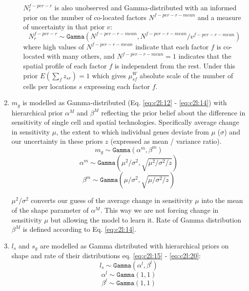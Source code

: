 \documentclass[11pt,a4paper]{article}
\begin{document}
\begin{enumerate}
\begin{itemize}
        $N_r^{f-per-r}$ is also unobserved and Gamma-distributed with an informed prior on the number of co-located factors $N^{f-per-r-mean}$ and a measure of uncertainty in that prior $v$:
        \begin{equation} \label{eq:c2l:11}
        N_r^{f-per-r} \sim \mathtt{Gamma}(N^{f-per-r-mean}, N^{f-per-r-mean} / v^{f-per-r-mean})
        \end{equation}
        where high values of $N^{f-per-r-mean}$ indicate that each factor $f$ is co-located with many others, and $N^{f-per-r-mean} = 1$ indicates that the spatial profile of each factor $f$ is independent from the rest. Under this prior $E(\sum_{f} z_{sr}) = 1$ which gives ${\mu}^{W}_{sf}$ absolute scale of the number of cells per locations $s$ expressing each factor $f$.
    
        \end{itemize}
    
    \item $m_{g}$ is modelled as Gamma-distributed (Eq. \ref{eq:c2l:12} - \ref{eq:c2l:14}) with hierarchical prior $\alpha^M$ and $\beta^M$ reflecting the prior belief about the difference in sensitivity of single cell and spatial technologies. Specifically average change in sensitivity $\mu$, the extent to which individual genes deviate from $\mu$ ($\sigma$) and our uncertainty in these priors $z$ (expressed as mean / variance ratio).
    \begin{equation} \label{eq:c2l:12}
    m_{g} \sim \mathtt{Gamma}(\alpha^m, \beta^m) 
    \end{equation}
    \begin{equation} \label{eq:c2l:13}
    \alpha^m \sim \mathtt{Gamma}(\mu ^ 2 / \sigma ^ 2,  \sqrt{\mu ^ 2 / \sigma ^ 2 / z})
    \end{equation}
    \begin{equation} \label{eq:c2l:14}
    \beta^m \sim \mathtt{Gamma}(\mu / \sigma ^ 2,  \sqrt{\mu / \sigma ^ 2 / z})
    \end{equation}
    
    $\mu ^ 2 / \sigma ^ 2$ converts our guess of the average change in sensitivity $\mu$ into the mean of the shape parameter of $\alpha^M$. This way we are not forcing change in sensitivity $\mu$ but allowing the model to learn it. Rate of Gamma distribution $\beta^M$ is defined according to Eq. \ref{eq:c2l:14}.
    
    \item $l_s$ and $s_{g}$ are modelled as Gamma distributed with hierarchical priors on shape and rate of their distributions eq. \ref{eq:c2l:15} - \ref{eq:c2l:20}:
    \begin{equation} \label{eq:c2l:15}
    l_s \sim \mathtt{Gamma}(\alpha^l,  \beta^l)
    \end{equation}
    \begin{equation} \label{eq:c2l:16}
    \alpha^l \sim \mathtt{Gamma}(1, 1)
    \end{equation}
    \begin{equation} \label{eq:c2l:17}
    \beta^l \sim \mathtt{Gamma}(1, 1)
    \end{equation}
    

\end{enumerate}
\end{document}
